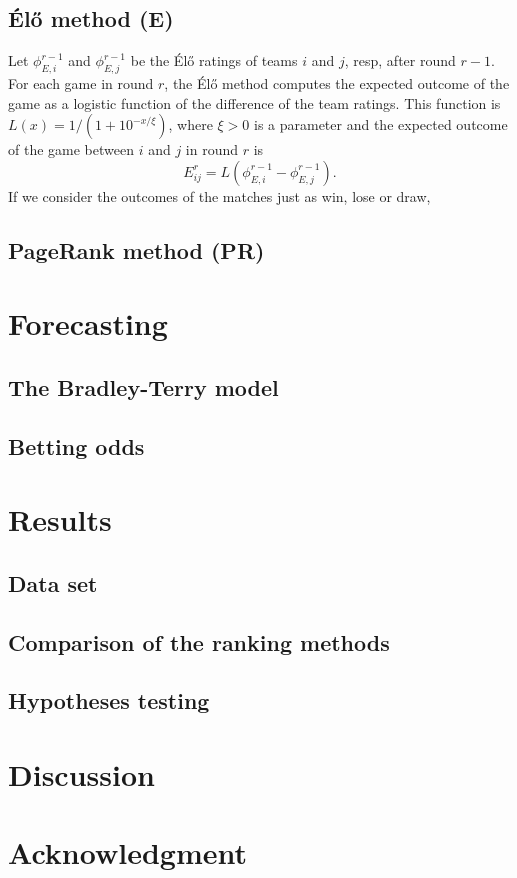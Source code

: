 \documentclass{article}
\begin{document}
\subsection{\'El\H{o} method (E)}

Let $\phi^{r-1}_{E,i}$ and $\phi^{r-1}_{E,j}$ be the \'El\H{o} ratings of teams $i$ and $j$, resp, after round $r-1$. For each game in round $r$, the \'El\H{o} method computes the expected outcome of the game as a logistic function of the difference of the team ratings. This function is $L(x)=1/(1+10^{-x/\xi})$, where $\xi>0$ is a parameter and the expected outcome of the game between $i$ and $j$ in round $r$ is
\begin{equation}\label{eq: Elo}
E^r_{ij}=L(\phi^{r-1}_{E,i}-\phi^{r-1}_{E,j}).
\end{equation}
If we consider the outcomes of the matches just as win, lose or draw, 

\subsection{PageRank method (PR)}

\section{Forecasting}

\subsection{The Bradley-Terry model}

\subsection{Betting odds}

\section{Results} \label{sec: Results}

\subsection{Data set}

\subsection{Comparison of the ranking methods}

\subsection{Hypotheses testing}

\section{Discussion}

\section*{Acknowledgment}

{}   %
\end{document}
